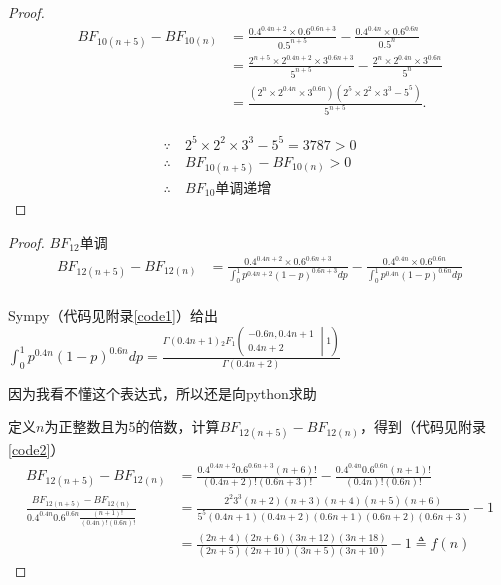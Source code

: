 \documentclass[stu,12pt,floatsintext]{apa7} %
\begin{document}
\begin{enumerate}[itemsep=2pt,topsep=0pt,parsep=0pt,label=(\alph*)]
\begin{proof}
    \begin{align*}
        BF_{10(n+5)}-BF_{10(n)} & = \frac{0.4^{0.4n+2} \times 0.6^{0.6n+3}}{0.5^{n+5}} - \frac{0.4^{0.4n} \times 0.6^{0.6n}}{0.5^{n}}\\
        & = \frac{2^{n+5}\times 2^{0.4n+2}\times 3^{0.6n+3}}{5^{n+5}} - \frac{2^{n}\times 2^{0.4n}\times 3^{0.6n}}{5^{n}}\\
        & = \frac{\left(2^{n}\times 2^{0.4n}\times 3^{0.6n}\right)\left( 2^5\times 2^2 \times 3^3 - 5^5 \right)}{5^{n+5}}.
    \end{align*}

    \begin{align*}
    \because & \ 2^5\times 2^2 \times 3^3 - 5^5 = 3787 > 0 \\
    \therefore & \ BF_{10(n+5)}-BF_{10(n)} > 0\\
    \therefore & \ BF_{10} \text{单调递增}
    \end{align*}
        
    \end{proof}
    

    \begin{proof}
    \(BF_{12}\)单调
    \begin{align*}
        BF_{12(n+5)}-BF_{12(n)} & = \frac{0.4^{0.4n+2} \times 0.6^{0.6n+3}}{\int_0^1 p^{0.4n+2} (1-p)^{0.6n+3} dp} - \frac{0.4^{0.4n} \times 0.6^{0.6n}}{\int_0^1 p^{0.4n} (1-p)^{0.6n} dp}\\
    \end{align*}
    
    Sympy（代码见附录\ref{code1}）给出\(\int_0^1 p^{0.4n} (1-p)^{0.6n} dp = \displaystyle \frac{\Gamma\left(0.4 n + 1\right) {{}_{2}F_{1}\left(\begin{matrix} - 0.6 n, 0.4 n + 1 \\ 0.4 n + 2 \end{matrix}\middle| {1} \right)}}{\Gamma\left(0.4 n + 2\right)}\)
    
    \vspace{0.2\baselineskip}
    因为我看不懂这个表达式，所以还是向python求助
    
    定义\(n\)为正整数且为5的倍数，计算\(BF_{12(n+5)}-BF_{12(n)}\)，得到（代码见附录\ref{code2}）
    \begin{align*}
        BF_{12(n+5)}-BF_{12(n)} & = \frac{{0.4}^{0.4 n + 2} {0.6}^{0.6 n + 3} \left( n + 6\right)!}{\left(0.4 n + 2\right)! \left(0.6 n + 3\right)!} - \frac{{0.4}^{0.4 n} {0.6}^{0.6 n} \left( n + 1\right)!}{\left(0.4 n\right)! \left(0.6 n\right)!}\\
        \frac{BF_{12(n+5)}-BF_{12(n)}}{{0.4}^{0.4 n} {0.6}^{0.6 n} \frac{\left( n + 1\right)!}{\left(0.4 n\right)! \left(0.6 n\right)!}} & =  \frac{{2}^{2} {3}^{3} (n+2)(n+3)(n+4)(n+5)(n+6)}{5^5(0.4 n + 1)(0.4 n + 2) (0.6 n + 1)(0.6 n + 2)(0.6 n + 3)} - 1\\
        & = \frac{(2n+4)(2n+6)(3n+12)(3n+18)}{(2n+5)(2n+10)(3n+5)(3n+10)}-1\triangleq f(n)
    \end{align*}



\end{proof}
\end{enumerate}
\end{document}
